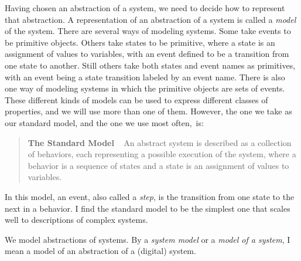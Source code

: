 \documentclass[fleqn,leqno]{article}
\begin{document}
\begin{en}
Having chosen an abstraction of a system, we need to decide how to
represent that abstraction.  A representation of an abstraction of a
system is called a 
\emph{model} of the system.  There are several ways
of modeling systems.  Some take events to be primitive objects.
Others take states to be primitive, where a state is an assignment of
values to variables, with an event defined to be a transition from one
state to another.  Still others take both states and event names as
primitives, with an event being a state transition labeled by an event
name.  There is also one way of modeling systems in which the
primitive objects are sets of events.  These different kinds of models
can be used to express different classes of properties, and we will
use more than one of them.  However, the one we take as our standard
model, and the one we use most often,~is:
\begin{quote}
\textbf{The Standard Model} \  
An 
abstract system is described as a collection of behaviors, each
representing a possible execution of the system, where a 
behavior is a
sequence of states and a 
state is an assignment of values to
variables.
\end{quote}
In this model, an 
event, also called a 
\emph{step}, is the transition from one state to the next in a
behavior.  I find the standard model to be the simplest one that
scales well to descriptions of complex systems.

We model abstractions of systems.  By a \emph{system model} or a
\emph{model of a system}, I mean a model of an abstraction of a
(digital) system.
\end{en}
\end{document}
